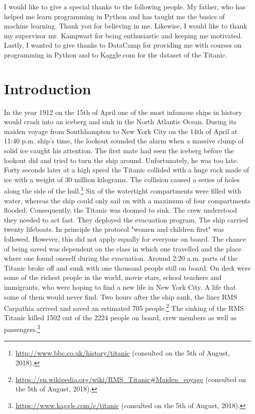 \documentclass[11pt]{article}
\begin{document}
I would like to give a special thanks to the following people. My father, who has helped me learn programming in Python and has taught me the basics of machine learning. Thank you for believing in me. Likewise, I would like to thank my supervisor mr. Kampwart for being enthusiastic and keeping me motivated. Lastly, I wanted to give thanks to DataCamp for providing me with courses on programming in Python and to Kaggle.com for the dataset of the Titanic. 

\newpage

\setcounter{tocdepth}{2}
\tableofcontents

\newpage


\section{Introduction}
\label{sec:orgdc30f88}

In the year 1912 on the 15th of April one of the most infamous ships in history would crash into an iceberg and sink in the North Atlantic Ocean. During its maiden voyage from Southhampton to New York City on the 14th of April at 11:40 p.m. ship's time, the lookout sounded the alarm  when a massive clump of solid ice caught his attention. The first mate had seen the iceberg before the lookout did and tried to turn the ship around. Unfortunately, he was too late. Forty seconds later at a high speed the Titanic collided with a huge rock made of ice with a weight of 30 million kilograms. The collision caused a series of holes along the side of the hull.\footnote{\url{http://www.bbc.co.uk/history/titanic} (consulted on the 5th of August, 2018).} Six of the watertight compartments were filled with water, whereas the ship could only sail on with a maximum of four compartments flooded. Consequently, the Titanic was doomed to sink. The crew understood they needed to act fast. They deployed the evacuation program. The ship carried twenty lifeboats. In principle the protocol "women and children first" was followed. However, this did not apply equally for everyone on board. The chance of being saved was  dependent on the class in which one travelled and the place where one found oneself during the evacuation. Around 2:20 a.m. parts of the Titanic broke off and sunk with one thousand people still on board. On deck were some of the richest people in the world, movie stars, school teachers and immigrants, who were hoping to find a new life in New York City. A life that some of them  would never find. Two hours after the ship sank, the liner RMS Carpathia arrived and saved an estimated 705 people.\footnote{\url{https://en.wikipedia.org/wiki/RMS\_Titanic\#Maiden\_voyage} (consulted on the 5th of August, 2018).} The sinking of the RMS Titanic killed 1502 out of the 2224 people on board, crew members as well as passengers.\footnote{\url{https://www.kaggle.com/c/titanic} (consulted on the 5th of August, 2018).}
\end{document}
